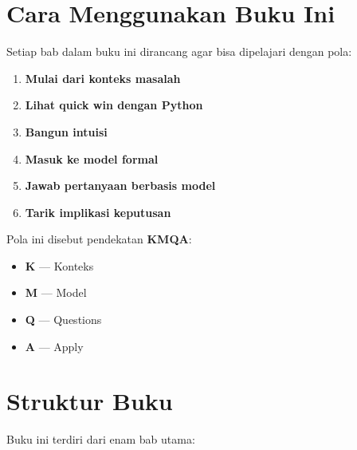 \documentclass[
  letterpaper,
  DIV=11,
  numbers=noendperiod]{scrreprt}
\providecommand{\tightlist}{%
  \setlength{\itemsep}{0pt}\setlength{\parskip}{0pt}}
\begin{document}
\section{Cara Menggunakan Buku Ini}\label{cara-menggunakan-buku-ini}

Setiap bab dalam buku ini dirancang agar bisa dipelajari dengan pola:

\begin{enumerate}
\def\labelenumi{\arabic{enumi}.}
\tightlist
\item
  \textbf{Mulai dari konteks masalah}
\item
  \textbf{Lihat quick win dengan Python}
\item
  \textbf{Bangun intuisi}
\item
  \textbf{Masuk ke model formal}
\item
  \textbf{Jawab pertanyaan berbasis model}
\item
  \textbf{Tarik implikasi keputusan}
\end{enumerate}

Pola ini disebut pendekatan \textbf{KMQA}:

\begin{itemize}
\tightlist
\item
  \textbf{K} --- Konteks\\
\item
  \textbf{M} --- Model\\
\item
  \textbf{Q} --- Questions\\
\item
  \textbf{A} --- Apply
\end{itemize}

\section{Struktur Buku}\label{struktur-buku}

Buku ini terdiri dari enam bab utama:
\end{document}
